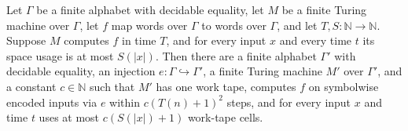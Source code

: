 \begin{theorem}
\label{Turing.FinTM.one_work_tape_binary_spaceUsed}
\leanok
{}
Let $\Gamma$ be a finite alphabet with decidable equality, let $M$ be a finite Turing
machine over $\Gamma$, let $f$ map words over $\Gamma$ to words over $\Gamma$, and let
$T,S\colon\mathbb N\to\mathbb N$. Suppose $M$ computes $f$ in time $T$, and for every
input $x$ and every time $t$ its space usage is at most $S(|x|)$. Then there are a
finite alphabet $\Gamma'$ with decidable equality, an injection
$e\colon\Gamma\hookrightarrow\Gamma'$, a finite Turing machine $M'$ over $\Gamma'$, and
a constant $c\in\mathbb N$ such that $M'$ has one work tape, computes $f$ on symbolwise
encoded inputs via $e$ within $c(T(n)+1)^2$ steps, and for every input $x$ and time $t$
uses at most $c(S(|x|)+1)$ work-tape cells.
\end{theorem}

